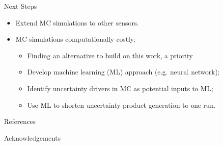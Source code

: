 \documentclass[final]{beamer}
\newlength{\onecolwid}
\begin{document}
\begin{frame}[t]
\begin{columns}[t]
\begin{column}{\onecolwid} %


\begin{block}{Next Steps}
\begin{itemize}
\item Extend MC simulations to other sensors.
\item MC simulations computationally costly;
	\begin{itemize}
	\item Finding an alternative to build on this work, a priority
	\item Develop machine learning (ML) approach (e.g. neural network);
	\item Identify uncertainty drivers in MC as potential inputs to ML;
 	\item Use ML to shorten uncertainty product generation to one run. 
	\end{itemize}
\end{itemize}

\end{block}



\begin{block}{References}
\nocite{} %
\small{
\vspace{0.75in}}

\end{block}



\begin{block}{Acknowledgements}

\small{} \\


\end{block}
\end{column}
\end{columns}
\end{frame}
\end{document}
